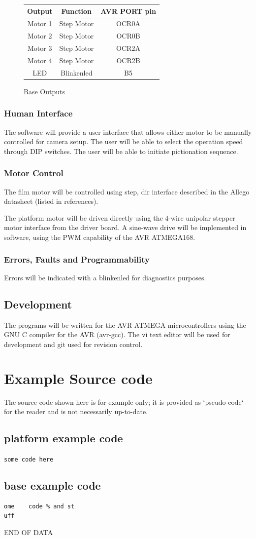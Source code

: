 \documentclass[dvips,12pt]{article}
\begin{document}
\renewcommand{\arraystretch}{1.4}%
\begin{figure}[htb]
\centering
\caption{Base Outputs}
\begin{tabular}{|c|c|c|}
\hline
Output&Function&AVR PORT pin\\
\hline
Motor 1&Step Motor&OCR0A\\
\hline
Motor 2&Step Motor&OCR0B\\
\hline
Motor 3&Step Motor&OCR2A\\
\hline
Motor 4&Step Motor&OCR2B\\
\hline
LED&Blinkenled&B5\\
\hline
\end{tabular}
\label{fig:baseoutputs}
\end{figure}

\subsubsection{Human Interface}
The software will provide a user interface that allows either motor to be manually controlled for camera setup. The user will be able to select the operation speed through DIP switches. The user will be able to initiate pictionation sequence. 
\subsubsection{Motor Control}
The film motor will be controlled using step, dir interface described in the Allego datasheet (listed in references).

The platform motor will be driven directly using the 4-wire unipolar stepper motor interface from the driver board. A sine-wave drive will be implemented in software, using the PWM capability of the AVR ATMEGA168.
\subsubsection{Errors, Faults and Programmability}
Errors will be indicated with a blinkenled for diagnostics purposes.
\subsection{Development}
The programs will be written for the AVR ATMEGA microcontrollers using the GNU C compiler for the AVR (avr-gcc). The vi text editor will be used for development and git used for revision control. 


\section{Example Source code}
The source code shown here is for example only; it is provided as `pseudo-code` for the reader and is not necessarily up-to-date.
\subsection{platform example code}
\texttt{some code here}
\subsection{base example code}
\begin{verbatim}
ome    code % and st
uff
\end{verbatim}
\centering

\vspace{2cm}

END OF DATA
\appendix
\end{document}
